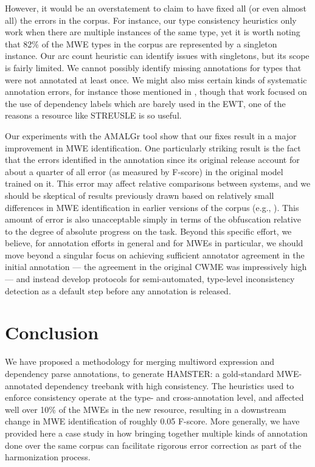 \documentclass[output=paper
,modfonts
,nonflat]{langsci/langscibook}
\begin{document}
However, it would be an overstatement to claim to have fixed all (or even almost all) the errors in the corpus. For instance, our type consistency heuristics only work when there are multiple instances of the same type, yet it is worth noting that 82\% of the MWE types in the corpus are represented by a singleton instance. Our arc count heuristic can identify issues with singletons, but its scope is fairly limited. We cannot possibly identify missing annotations for types that were not annotated at least once. We might also miss certain kinds of systematic annotation errors, for instance those mentioned in \citet{de2015studying}, though that work focused on the use of  dependency labels which are barely used in the EWT, one of the reasons a resource like STREUSLE is so useful.

Our experiments with the AMALGr tool show that our fixes result in a major improvement in MWE identification. One particularly striking result is the fact that the errors identified in the annotation since its original release account for about a quarter of all error (as measured by F-score) in the original model trained on it. This error may affect relative comparisons between systems, and we should be skeptical of results previously drawn based on relatively small differences in MWE identification in earlier versions of the corpus (e.g., \citet{Qu+:2015a}). This amount of error is also unacceptable simply in terms of the obfuscation relative to the degree of absolute progress on the task. Beyond this specific effort, we believe, for annotation efforts in general and for MWEs in particular, we should move beyond a singular focus on achieving sufficient annotator agreement in the initial annotation --- the agreement in the original CWME was impressively high --- and instead develop protocols for semi-automated, type-level inconsistency detection as a default step before any annotation is released. 

\section{Conclusion}

We have proposed a methodology for merging multiword expression and dependency parse annotations, to generate HAMSTER: a gold-standard MWE-annotated dependency treebank with high consistency. The heuristics used to enforce consistency operate at the type- and cross-annotation level, and affected well over 10\% of the MWEs in the new resource, resulting in a downstream change in MWE identification of roughly 0.05 F-score. More generally, we have provided here a case study in how bringing together multiple kinds of annotation done over the same corpus can facilitate rigorous error correction as part of the harmonization process.

%
%

{\sloppy
\printbibliography[heading=subbibliography,notkeyword=this]
}
\end{document}
